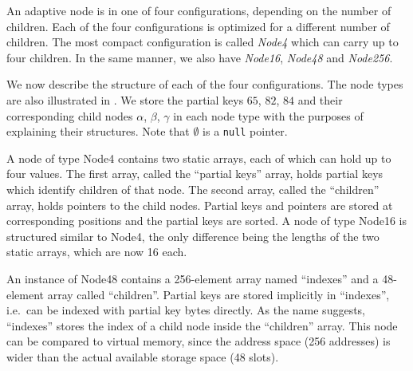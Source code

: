 \documentclass[abstracton,12pt]{scrartcl}
\theoremstyle{definition}
\begin{document}
An adaptive node is in one of four configurations, depending on the number
of children. Each of the four configurations is optimized for a different
number of children. The most compact configuration is called
\textit{Node4} which can carry up to four children. In the same manner,
we also have \textit{Node16}, \textit{Node48} and \textit{Node256}.

We now describe the structure of each of the four configurations.
The node types are also illustrated in .
We store the partial keys $65$, $82$, $84$ and their corresponding child nodes
$\alpha$, $\beta$, $\gamma$ in each node type with the purposes of explaining 
their structures. Note that $\emptyset$ is a \texttt{null} pointer.

A node of type Node4 contains two static arrays, each of which can hold
up to four values. The first array, called the ``partial keys'' array, holds
partial keys which identify children of that node. The second array,
called the ``children'' array, holds pointers to the child nodes.
Partial keys and pointers are stored at corresponding positions and
the partial keys are sorted. A node of type Node16 is structured similar
to Node4, the only difference being the lengths of the two static arrays,
which are now 16 each.

An instance of Node48 contains a 256-element array named 
``indexes'' and a 48-element array called ``children''.
Partial keys are stored implicitly in ``indexes'', i.e.\ 
can be indexed with partial key bytes directly.
As the name suggests, ``indexes'' stores the index of a child
node inside the ``children'' array. This node can be compared to
virtual memory, since the address space (256 addresses) is wider 
than the actual available storage space (48 slots).
\end{document}
